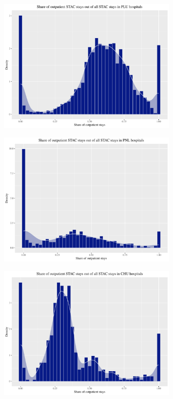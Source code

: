 \begin{figure}[!htb]
    \centering
    \includegraphics[width=0.8\textwidth]{../../Figures/2016-2019/STAC_share_PLU.pdf}
\end{figure}

\clearpage
\begin{figure}[!htb]
    \centering
    \includegraphics[width=0.8\textwidth]{../../Figures/2016-2019/STAC_share_PNL.pdf}
\end{figure}

\begin{figure}[!htb]
    \centering
    \includegraphics[width=0.8\textwidth]{../../Figures/2016-2019/STAC_share_CHU.pdf}
\end{figure}

